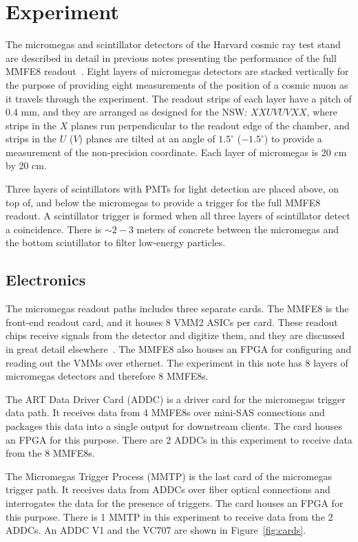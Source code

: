 \section{Experiment}
\label{sec:exp}

The micromegas and scintillator detectors of the Harvard cosmic ray test stand are described in detail in previous notes presenting the performance of the full MMFE8 readout~\cite{noisy,noiseless}. Eight layers of micromegas detectors are stacked vertically for the purpose of providing eight measurements of the position of a cosmic muon as it travels through the experiment. The readout strips of each layer have a pitch of 0.4 mm, and they are arranged as designed for the NSW: $XXUVUVXX$, where strips in the $X$ planes run perpendicular to the readout edge of the chamber, and strips in the $U$ ($V$) planes are tilted at an angle of $1.5^\circ$ ($-1.5^\circ$) to provide a measurement of the non-precision coordinate. Each layer of micromegas is 20 cm by 20 cm.

Three layers of scintillators with PMTs for light detection are placed above, on top of, and below the micromegas to provide a trigger for the full MMFE8 readout. A scintillator trigger is formed when all three layers of scintillator detect a coincidence. There is $\sim\!2\!-\!3$ meters of concrete between the micromegas and the bottom scintillator to filter low-energy particles.

\subsection{Electronics}
\label{sec:exp-elx}

The micromegas readout paths includes three separate cards. The MMFE8 is the front-end readout card, and it houses 8 VMM2 ASICs per card. These readout chips receive signals from the detector and digitize them, and they are discussed in great detail elsewhere~\cite{nswtdr,noisy,noiseless}. The MMFE8 also houses an FPGA for configuring and reading out the VMMs over ethernet. The experiment in this note has 8 layers of micromegas detectors and therefore 8 MMFE8s.

The ART Data Driver Card (ADDC) is a driver card for the micromegas trigger data path. It receives data from 4 MMFE8s over mini-SAS connections and packages this data into a single output for downstream clients. The card houses an FPGA for this purpose. There are 2 ADDCs in this experiment to receive data from the 8 MMFE8s.

The Micromegas Trigger Process (MMTP) is the last card of the micromegas trigger path. It receives data from ADDCs over fiber optical connections and interrogates the data for the presence of triggers. The card houses an FPGA for this purpose. There is 1 MMTP in this experiment to receive data from the 2 ADDCs. An ADDC V1 and the VC707 are shown in Figure~\ref{fig:cards}.

